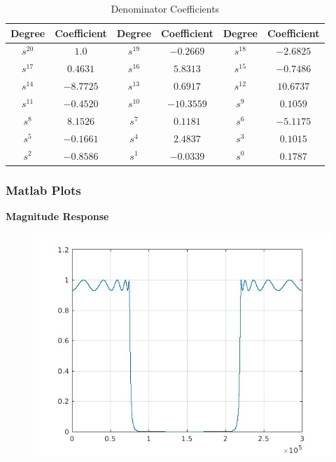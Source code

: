 \documentclass{article}
\begin{document}
\begin{table}[H]
    \centering
    \begin{adjustwidth}{0cm}{}
        \caption{Denominator Coefficients}
        \begin{tabular}{|c|c|c|c|c|c|}
            \hline
            Degree & Coefficient & Degree & Coefficient & Degree & Coefficient \\
            \hline
            $s^{20}$ & $1.0$ & $s^{19}$ & $-0.2669$ & $s^{18}$ & $-2.6825$ \\
            \hline
            $s^{17}$ & $0.4631$ & $s^{16}$ & $5.8313$ & $s^{15}$ & $-0.7486$ \\
            \hline
            $s^{14}$ & $-8.7725$ & $s^{13}$ & $0.6917$ & $s^{12}$ & $10.6737$ \\
            \hline
            $s^{11}$ & $-0.4520$ & $s^{10}$ & $-10.3559$ & $s^{9}$ & $0.1059$ \\
            \hline
            $s^{8}$ & $8.1526$ & $s^{7}$ & $0.1181$ & $s^{6}$ & $-5.1175$ \\
            \hline
            $s^{5}$ & $-0.1661$ & $s^{4}$ & $2.4837$ & $s^{3}$ & $0.1015$ \\
            \hline
            $s^{2}$ & $-0.8586$ & $s^{1}$ & $-0.0339$ & $s^{0}$ & $0.1787$ \\
            \hline
        \end{tabular}
    \end{adjustwidth}
\end{table}
\newpage
\subsubsection{Matlab Plots}
\textbf{Magnitude Response}
\begin{figure}[H]
\hspace*{-2.5cm}
    \centering
    \includegraphics[scale = 0.5]{bsf_cheby_mag.jpg}
    \label{fig:my_label}
\end{figure}
\end{document}
